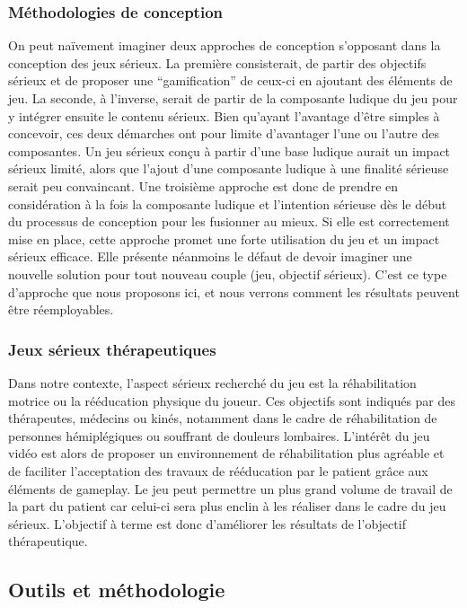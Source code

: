 	\subsubsection{Méthodologies de conception}
On peut naïvement imaginer deux approches de conception s’opposant dans la conception des jeux sérieux. La première consisterait, de partir des objectifs sérieux et de proposer une “gamification” de ceux-ci en ajoutant des éléments de jeu. La seconde, à l’inverse, serait de partir de la composante ludique du jeu pour y intégrer ensuite le contenu sérieux. Bien qu’ayant l’avantage d’être simples à concevoir, ces deux démarches ont pour limite d’avantager l’une ou l’autre des composantes. Un jeu sérieux conçu à partir d’une base ludique aurait un impact sérieux limité, alors que l’ajout d’une composante ludique à une finalité sérieuse serait peu  convaincant.
Une troisième approche est donc de prendre en considération à la fois la composante ludique et l’intention sérieuse dès le début du processus de conception pour les fusionner au mieux. Si elle est correctement mise en place, cette approche promet une forte utilisation du jeu et un impact sérieux efficace. Elle présente néanmoins le défaut de devoir imaginer une nouvelle solution pour tout nouveau couple (jeu, objectif sérieux). C’est ce type d’approche que nous proposons ici, et nous verrons comment les résultats peuvent être réemployables.

	\subsubsection{Jeux sérieux thérapeutiques}
Dans notre contexte, l’aspect sérieux recherché du jeu est la réhabilitation motrice ou la rééducation physique du joueur. Ces objectifs sont indiqués par des thérapeutes, médecins ou kinés, notamment dans le cadre de réhabilitation de personnes hémiplégiques ou souffrant de douleurs lombaires. L’intérêt du jeu vidéo est alors de proposer un environnement de réhabilitation plus agréable et de faciliter l’acceptation des travaux de rééducation par le patient grâce aux éléments de gameplay. Le jeu peut permettre un plus grand volume de travail de la part du patient car celui-ci sera plus enclin à les réaliser dans le cadre du jeu sérieux. L’objectif à terme est donc d’améliorer les résultats de l’objectif thérapeutique.

\subsection{Outils et méthodologie}
